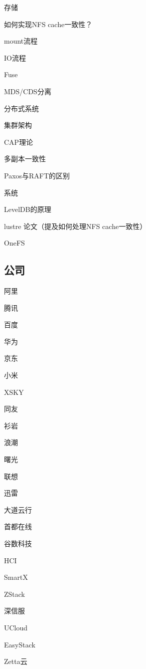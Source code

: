 存储
\begin{enumbox}
\item 如何实现NFS cache一致性？
\item mount流程
\item IO流程
\item Fuse
\item MDS/CDS分离
\end{enumbox}

分布式系统
\begin{enumbox}
\item 集群架构
\item CAP理论
\item 多副本一致性
\item Paxos与RAFT的区别
\end{enumbox}

系统
\begin{enumbox}
\item LevelDB的原理
\item lustre 论文（提及如何处理NFS cache一致性）
\item OneFS
\end{enumbox}

\subsection{公司}

\begin{enumbox}
\item 阿里
\item 腾讯
\item 百度
\item 华为
\item 京东
\item 小米
\item XSKY
\item 同友
\item 衫岩
\item 浪潮
\item 曙光
\item 联想
\item 迅雷
\item 大道云行
\item 首都在线
\item 谷数科技
\end{enumbox}

HCI
\begin{enumbox}
\item SmartX
\item ZStack
\item 深信服
\item UCloud
\item EasyStack
\item Zetta云
\end{enumbox}

